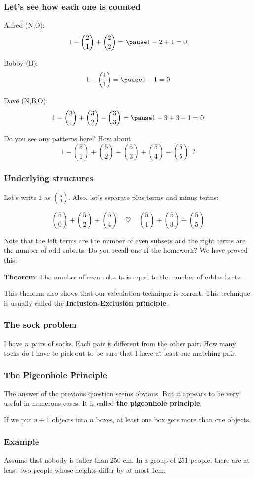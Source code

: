 \begin{frame}\frametitle{Let's see how each one is counted}
  Alfred (N,O): \pause $$1 - {2\choose 1} + {2\choose 2} = \pause 1 - 2 + 1 = 0$$

  Bobby (B): \pause $$1 - {1\choose 1} = \pause 1 - 1 = 0$$

  Dave (N,B,O): \pause $$1 - {3\choose 1} + {3\choose 2} - {3\choose 3} = \pause 1 - 3 + 3 - 1 = 0$$

  \pause

  Do you see any patterns here?
  \pause
  How about $$1 - {5\choose 1} + {5\choose 2} - {5\choose 3} + {5\choose 4} - {5\choose 5}\ \ ?$$
\end{frame}

\begin{frame}\frametitle{Underlying structures}
  Let's write $1$ as ${5\choose 0}$.  Also, let's separate plus terms
  and minus terms:

  $${5\choose 0} + {5\choose 2} + {5\choose 4}
  \ \ \ \ \ \heartsuit \ \ \ \ \
  {5\choose 1} + {5\choose 3} + {5\choose 5}$$

  \pause
  \vspace{0.1in}
  Note that the left terms are the number of even subsets and the
  right terms are the number of odd subsets.  Do you recall one of the
  homework? \pause We have proved this:

  \begin{tcolorbox}
    {\bf Theorem:} The number of even subsets is equal to the number
    of odd subsets.
  \end{tcolorbox}

  This theorem also shows that our calculation technique is correct.
  This technique is usually called the {\bf Inclusion-Exclusion
    principle}.
\end{frame}

\begin{frame}\frametitle{The sock problem}
  \begin{tcolorbox}
    I have $n$ pairs of socks.  Each pair is different from the other
    pair.  How many socks do I have to pick out to be sure that I have
    at least one matching pair.
  \end{tcolorbox}
  \vspace{2in}
\end{frame}

\begin{frame}\frametitle{The Pigeonhole Principle}
  The answer of the previous question seems obvious.  But it appears
  to be very useful in numerous cases.  It is called {\bf the
    pigeonhole principle}.

  \begin{tcolorbox}[title=The pigeonhole principle]
    If we put $n+1$ objects into $n$ boxes, at least one box gets more
    than one objects.
  \end{tcolorbox}
\end{frame}

\begin{frame}\frametitle{Example}
  \begin{tcolorbox}
    Assume that nobody is taller than 250 cm.  In a group of 251
    people, there are at least two people whose heights differ by at
    most 1cm.
  \end{tcolorbox}
  \vspace{2in}
\end{frame}

